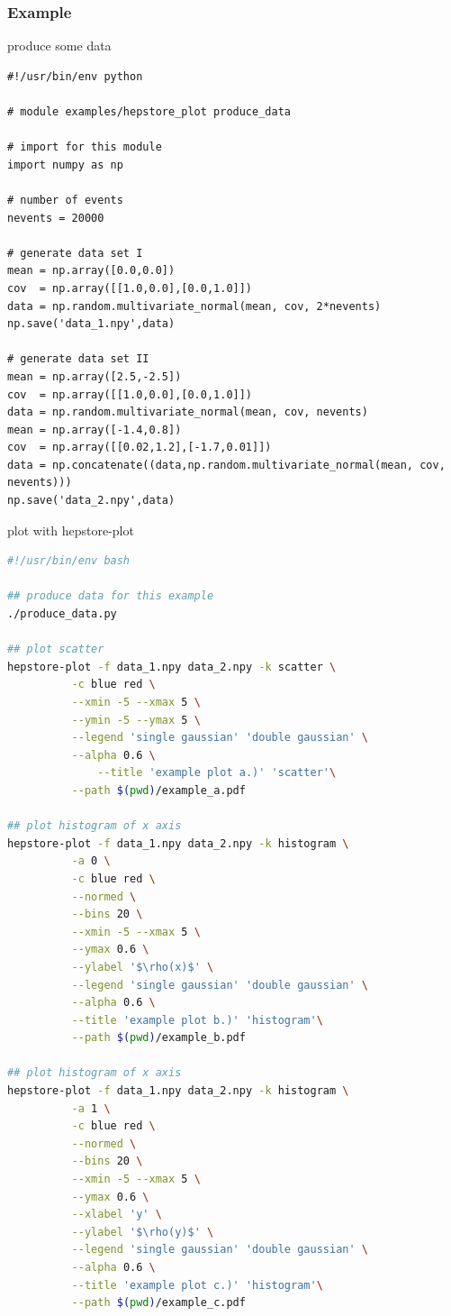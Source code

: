 \documentclass[aps,prd,11pt,tightenlines,superscriptaddress,nofootinbib,preprintnumbers,notitlepage]{revtex4-1}
\begin{document}
\subsubsection{Example}
produce some data
%
\begin{lstlisting}
#!/usr/bin/env python

# module examples/hepstore_plot produce_data

# import for this module
import numpy as np

# number of events
nevents = 20000

# generate data set I
mean = np.array([0.0,0.0])
cov  = np.array([[1.0,0.0],[0.0,1.0]])
data = np.random.multivariate_normal(mean, cov, 2*nevents)
np.save('data_1.npy',data)

# generate data set II
mean = np.array([2.5,-2.5])
cov  = np.array([[1.0,0.0],[0.0,1.0]])
data = np.random.multivariate_normal(mean, cov, nevents)
mean = np.array([-1.4,0.8])
cov  = np.array([[0.02,1.2],[-1.7,0.01]])
data = np.concatenate((data,np.random.multivariate_normal(mean, cov, nevents)))
np.save('data_2.npy',data)

\end{lstlisting}
%
plot with hepstore-plot
%
\begin{lstlisting}[language=Bash]
#!/usr/bin/env bash

## produce data for this example
./produce_data.py

## plot scatter
hepstore-plot -f data_1.npy data_2.npy -k scatter \
	      -c blue red \
	      --xmin -5 --xmax 5 \
	      --ymin -5 --ymax 5 \
	      --legend 'single gaussian' 'double gaussian' \
	      --alpha 0.6 \
              --title 'example plot a.)' 'scatter'\
	      --path $(pwd)/example_a.pdf

## plot histogram of x axis
hepstore-plot -f data_1.npy data_2.npy -k histogram \
	      -a 0 \
	      -c blue red \
	      --normed \
	      --bins 20 \
	      --xmin -5 --xmax 5 \
	      --ymax 0.6 \
	      --ylabel '$\rho(x)$' \
	      --legend 'single gaussian' 'double gaussian' \
	      --alpha 0.6 \
	      --title 'example plot b.)' 'histogram'\
	      --path $(pwd)/example_b.pdf

## plot histogram of x axis
hepstore-plot -f data_1.npy data_2.npy -k histogram \
	      -a 1 \
	      -c blue red \
	      --normed \
	      --bins 20 \
	      --xmin -5 --xmax 5 \
	      --ymax 0.6 \
	      --xlabel 'y' \
	      --ylabel '$\rho(y)$' \
	      --legend 'single gaussian' 'double gaussian' \
	      --alpha 0.6 \
	      --title 'example plot c.)' 'histogram'\
	      --path $(pwd)/example_c.pdf
\end{lstlisting}
\end{document}
